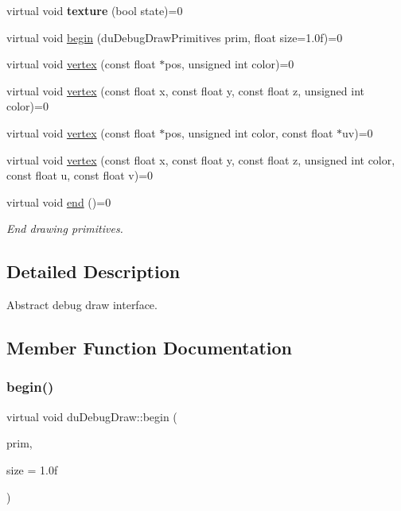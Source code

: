 \begin{DoxyCompactItemize}
virtual void {\bfseries texture} (bool state)=0
\item 
virtual void \hyperlink{structduDebugDraw_a6403932173f27503e05cd258f5837d17}{begin} (du\+Debug\+Draw\+Primitives prim, float size=1.\+0f)=0
\item 
virtual void \hyperlink{structduDebugDraw_a8fac1072846b60be4ce4810c68140ee8}{vertex} (const float $\ast$pos, unsigned int color)=0
\item 
virtual void \hyperlink{structduDebugDraw_a2af291d6e63081ce1d3f34e1851ae5e0}{vertex} (const float x, const float y, const float z, unsigned int color)=0
\item 
virtual void \hyperlink{structduDebugDraw_a711146a2e4be2ef9e0d6de7be8c714bc}{vertex} (const float $\ast$pos, unsigned int color, const float $\ast$uv)=0
\item 
virtual void \hyperlink{structduDebugDraw_a0f76c61eb9f274f17c91308c739211eb}{vertex} (const float x, const float y, const float z, unsigned int color, const float u, const float v)=0
\item 
\mbox{\label{structduDebugDraw_ac699459669944f2f950bbf972fe62a14}} 
virtual void \hyperlink{structduDebugDraw_ac699459669944f2f950bbf972fe62a14}{end} ()=0
\begin{DoxyCompactList}\small\item\em End drawing primitives. \end{DoxyCompactList}\end{DoxyCompactItemize}


\subsection{Detailed Description}
Abstract debug draw interface. 

\subsection{Member Function Documentation}
\mbox{\label{structduDebugDraw_a6403932173f27503e05cd258f5837d17}} 
\subsubsection{\texorpdfstring{begin()}{begin()}\hspace{0.1cm}{\footnotesize\ttfamily [1/2]}}
{\footnotesize\ttfamily virtual void du\+Debug\+Draw\+::begin (\begin{DoxyParamCaption}\item[{du\+Debug\+Draw\+Primitives}]{prim,  }\item[{float}]{size = {\ttfamily 1.0f} }\end{DoxyParamCaption})\hspace{0.3cm}{\ttfamily [pure virtual]}}

